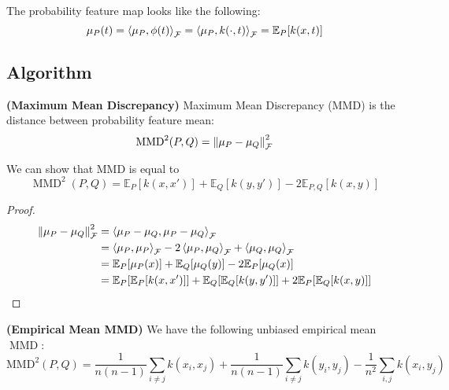 \begin{remark}
    The probability feature map looks like the following:
    \begin{equation*}
        \mu_P(t) = \left\langle \mu_P, \phi(t) \right\rangle_\mathcal{F} = \left\langle \mu_P, k(\cdot, t) \right\rangle_\mathcal{F} = \mathbb{E}_P[k(x, t)]
    \end{equation*}
\end{remark}

\subsection{Algorithm}

\begin{definition}{\textbf{(Maximum Mean Discrepancy)}}
    Maximum Mean Discrepancy (MMD) is the distance between probability feature mean:
    \begin{equation*}
        \text{MMD}^2(P, Q) = \left\lVert\mu_P-\mu_Q\right\rVert^2_\mathcal{F}
    \end{equation*}
\end{definition}

\begin{lemma}
    We can show that MMD is equal to 
    \begin{equation*}
        \operatorname{MMD}^2(P,Q) = \mathbb{E}_P[k(x, x')] + \mathbb{E}_Q[k(y, y')] - 2\mathbb{E}_{P, Q}[k(x, y)]
    \end{equation*}
\end{lemma}
\begin{proof}
    \begin{equation*}
    \begin{aligned}
        \left\lVert\mu_P-\mu_Q\right\rVert^2_\mathcal{F} &= \left\langle \mu_P-\mu_Q, \mu_P-\mu_Q \right\rangle_\mathcal{F} \\
        &= \left\langle \mu_P, \mu_P \right\rangle_\mathcal{F} - 2\left\langle \mu_P, \mu_Q \right\rangle_\mathcal{F} + \left\langle \mu_Q, \mu_Q \right\rangle_\mathcal{F} \\
        &= \mathbb{E}_P[\mu_P(x)] + \mathbb{E}_Q[\mu_Q(y)] - 2\mathbb{E}_{P}[\mu_Q(x)] \\
        &= \mathbb{E}_P[\mathbb{E}_P[k(x, x')]] + \mathbb{E}_Q[\mathbb{E}_Q[k(y, y')]] + 2\mathbb{E}_P[\mathbb{E}_Q[k(x, y)]]
    \end{aligned}
    \end{equation*}
\end{proof}

\begin{definition}{\textbf{(Empirical Mean MMD)}}
    We have the following unbiased empirical mean $\operatorname{MMD}$:
    \begin{equation*}
        \text{MMD}^2(P, Q) = \frac{1}{n(n-1)}\sum_{i\ne j}k(x_i, x_j) + \frac{1}{n(n-1)}\sum_{i\ne j}k(y_i, y_j) - \frac{1}{n^2}\sum_{i,j}k(x_i, y_j)
    \end{equation*}
\end{definition}

